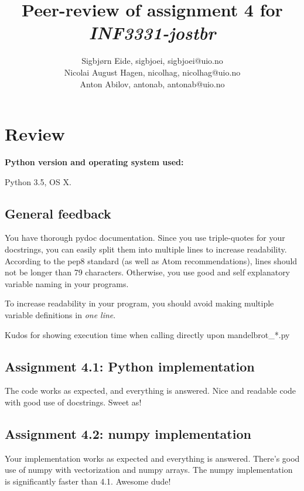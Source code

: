 \documentclass[a4paper]{article}
\title{Peer-review of assignment 4 for \textit{INF3331-jostbr}}
\author{Sigbjørn Eide, sigbjoei, {sigbjoei@uio.no} \\
 		Nicolai August Hagen, nicolhag, {nicolhag@uio.no} \\
		Anton Abilov, antonab, {antonab@uio.no}}
\begin{document}
\maketitle

\section{Review}\label{sec:review}

\textbf{Python version and operating system used:}

Python 3.5, OS X.

\subsection*{General feedback}

You have thorough pydoc documentation. Since you use triple-quotes for your docstrings, you can easily split them into multiple lines to increase readability. According to the pep8 standard (as well as Atom recommendations), lines should not be longer than 79 characters. Otherwise, you use good and self explanatory variable naming in your programs.

To increase readability in your program, you should avoid making multiple variable definitions in \textit{one line}.

Kudos for showing execution time when calling directly upon mandelbrot\_*.py


\subsection*{Assignment 4.1: Python implementation}

The code works as expected, and everything is answered. Nice and readable code with good use of docstrings. Sweet as!

\subsection*{Assignment 4.2:  numpy implementation} \label{sec:assignment5.2}

Your implementation works as expected and everything is answered. There's good use of numpy with vectorization and numpy arrays. The numpy implementation is significantly faster than 4.1. Awesome dude!
\end{document}
